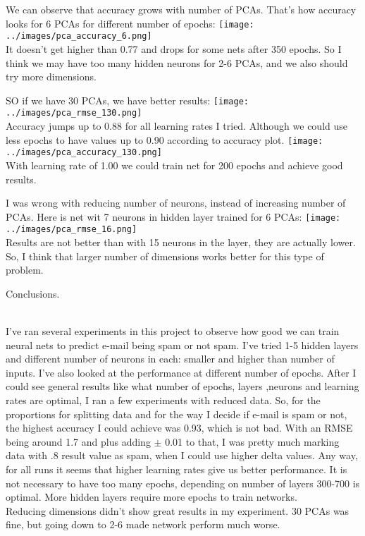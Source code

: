 \documentclass[12pt, letterpaper]{article}
\begin{document}
\begin{enumerate}[label=\Roman*.]
	    We can observe that accuracy grows with number of PCAs. That's how accuracy looks for 6 PCAs for different number of epochs:
	    {\center \texttt{[image: ../images/pca\_accuracy\_6.png]} \\}
	    It doesn't get higher than 0.77 and drops for some nets after 350 epochs. So I think we may have too many hidden neurons for 2-6 PCAs, and we also should try more dimensions.
	    
	    SO if we have 30 PCAs, we have better results:
	    {\center \texttt{[image: ../images/pca\_rmse\_130.png]} \\}
	    Accuracy jumps up to 0.88  for all learning rates I tried. Although we could use less epochs to have values up to 0.90  according to accuracy plot.
	     {\center \texttt{[image: ../images/pca\_accuracy\_130.png]} \\}
	     With learning rate of 1.00 we could train net for 200 epochs and achieve good results.
	     
	     I was wrong with reducing number of neurons, instead of increasing number of PCAs. Here is net wit 7 neurons in hidden layer trained for 6 PCAs:
	     {\center \texttt{[image: ../images/pca\_rmse\_16.png]} \\}
	     Results are not better than with 15 neurons in the layer, they are actually lower. So, I think that larger number of dimensions works better for this type of problem.
	     
	{\bf \item Conclusions.}\\
	
	I've ran several experiments in this project to observe how good we can train neural nets to predict e-mail being spam or not spam. I've tried 1-5 hidden layers and different number of neurons in each: smaller and higher than number of inputs. I've also looked at the performance at different number of epochs. After I could see general results like what number of epochs, layers ,neurons and learning rates are optimal, I ran a few experiments with reduced data. So, for the proportions for splitting data and for the way I decide if e-mail is spam or not, the highest accuracy I could achieve was 0.93, which is not bad. With an RMSE being around 1.7 and plus adding \( \pm \) 0.01 to that, I was pretty much marking data with .8 result value as spam, when I could use higher delta values. Any way, for all runs it seems that higher learning rates give us better performance. It is not necessary to have too many epochs, depending on number of layers 300-700 is optimal. More hidden layers require more epochs to train networks. \\
	Reducing dimensions didn't show great results in my experiment. 30 PCAs was fine, but going down to 2-6 made network perform much worse. \\
	
\end{enumerate}
\end{document}
